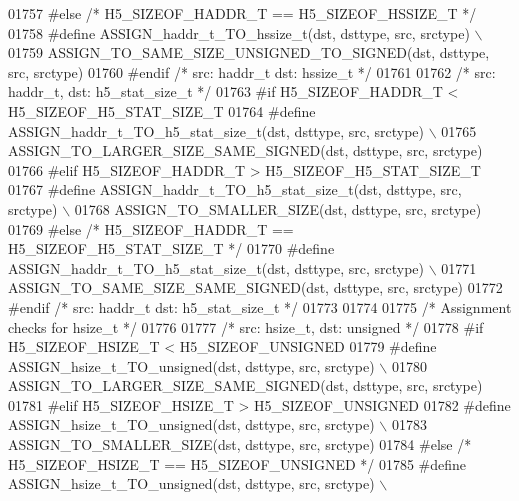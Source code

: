 \begin{DoxyCode}
01757 \textcolor{preprocessor}{#else }\textcolor{comment}{/* H5\_SIZEOF\_HADDR\_T == H5\_SIZEOF\_HSSIZE\_T */}\textcolor{preprocessor}{}
01758 \textcolor{preprocessor}{    #define ASSIGN\_haddr\_t\_TO\_hssize\_t(dst, dsttype, src, srctype) \(\backslash\)}
01759 \textcolor{preprocessor}{        ASSIGN\_TO\_SAME\_SIZE\_UNSIGNED\_TO\_SIGNED(dst, dsttype, src, srctype)}
01760 \textcolor{preprocessor}{#endif }\textcolor{comment}{/* src: haddr\_t dst: hssize\_t */}\textcolor{preprocessor}{}
01761 
01762 \textcolor{comment}{/* src: haddr\_t, dst: h5\_stat\_size\_t */}
01763 \textcolor{preprocessor}{#if H5\_SIZEOF\_HADDR\_T < H5\_SIZEOF\_H5\_STAT\_SIZE\_T}
01764 \textcolor{preprocessor}{    #define ASSIGN\_haddr\_t\_TO\_h5\_stat\_size\_t(dst, dsttype, src, srctype) \(\backslash\)}
01765 \textcolor{preprocessor}{        ASSIGN\_TO\_LARGER\_SIZE\_SAME\_SIGNED(dst, dsttype, src, srctype)}
01766 \textcolor{preprocessor}{#elif H5\_SIZEOF\_HADDR\_T > H5\_SIZEOF\_H5\_STAT\_SIZE\_T}
01767 \textcolor{preprocessor}{    #define ASSIGN\_haddr\_t\_TO\_h5\_stat\_size\_t(dst, dsttype, src, srctype) \(\backslash\)}
01768 \textcolor{preprocessor}{        ASSIGN\_TO\_SMALLER\_SIZE(dst, dsttype, src, srctype)}
01769 \textcolor{preprocessor}{#else }\textcolor{comment}{/* H5\_SIZEOF\_HADDR\_T == H5\_SIZEOF\_H5\_STAT\_SIZE\_T */}\textcolor{preprocessor}{}
01770 \textcolor{preprocessor}{    #define ASSIGN\_haddr\_t\_TO\_h5\_stat\_size\_t(dst, dsttype, src, srctype) \(\backslash\)}
01771 \textcolor{preprocessor}{        ASSIGN\_TO\_SAME\_SIZE\_SAME\_SIGNED(dst, dsttype, src, srctype)}
01772 \textcolor{preprocessor}{#endif }\textcolor{comment}{/* src: haddr\_t dst: h5\_stat\_size\_t */}\textcolor{preprocessor}{}
01773 
01774 
01775 \textcolor{comment}{/* Assignment checks for hsize\_t */}
01776 
01777 \textcolor{comment}{/* src: hsize\_t, dst: unsigned */}
01778 \textcolor{preprocessor}{#if H5\_SIZEOF\_HSIZE\_T < H5\_SIZEOF\_UNSIGNED}
01779 \textcolor{preprocessor}{    #define ASSIGN\_hsize\_t\_TO\_unsigned(dst, dsttype, src, srctype) \(\backslash\)}
01780 \textcolor{preprocessor}{        ASSIGN\_TO\_LARGER\_SIZE\_SAME\_SIGNED(dst, dsttype, src, srctype)}
01781 \textcolor{preprocessor}{#elif H5\_SIZEOF\_HSIZE\_T > H5\_SIZEOF\_UNSIGNED}
01782 \textcolor{preprocessor}{    #define ASSIGN\_hsize\_t\_TO\_unsigned(dst, dsttype, src, srctype) \(\backslash\)}
01783 \textcolor{preprocessor}{        ASSIGN\_TO\_SMALLER\_SIZE(dst, dsttype, src, srctype)}
01784 \textcolor{preprocessor}{#else }\textcolor{comment}{/* H5\_SIZEOF\_HSIZE\_T == H5\_SIZEOF\_UNSIGNED */}\textcolor{preprocessor}{}
01785 \textcolor{preprocessor}{    #define ASSIGN\_hsize\_t\_TO\_unsigned(dst, dsttype, src, srctype) \(\backslash\)}

\end{DoxyCode}
